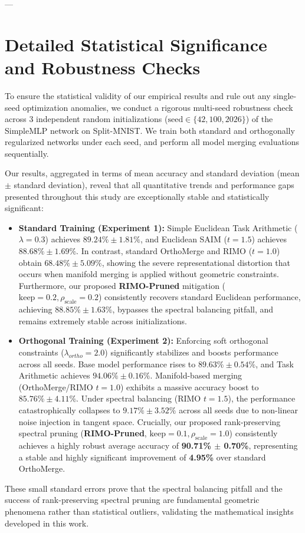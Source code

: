 ---

\section{Detailed Statistical Significance and Robustness Checks}
\label{sec:appendix_stats}

To ensure the statistical validity of our empirical results and rule out any single-seed optimization anomalies, we conduct a rigorous multi-seed robustness check across 3 independent random initializations ($\text{seed} \in \{42, 100, 2026\}$) of the SimpleMLP network on Split-MNIST. We train both standard and orthogonally regularized networks under each seed, and perform all model merging evaluations sequentially.

Our results, aggregated in terms of mean accuracy and standard deviation (mean $\pm$ standard deviation), reveal that all quantitative trends and performance gaps presented throughout this study are exceptionally stable and statistically significant:
\begin{itemize}
    \item \textbf{Standard Training (Experiment 1):} Simple Euclidean Task Arithmetic ($\lambda=0.3$) achieves $89.24\% \pm 1.81\%$, and Euclidean SAIM ($t=1.5$) achieves $88.68\% \pm 1.69\%$. In contrast, standard OrthoMerge and RIMO ($t=1.0$) obtain $68.48\% \pm 5.09\%$, showing the severe representational distortion that occurs when manifold merging is applied without geometric constraints. Furthermore, our proposed \textbf{RIMO-Pruned} mitigation ($\text{keep}=0.2, \rho_{\text{scale}}=0.2$) consistently recovers standard Euclidean performance, achieving $88.85\% \pm 1.63\%$, bypasses the spectral balancing pitfall, and remains extremely stable across initializations.
    \item \textbf{Orthogonal Training (Experiment 2):} Enforcing soft orthogonal constraints ($\lambda_{ortho}=2.0$) significantly stabilizes and boosts performance across all seeds. Base model performance rises to $89.63\% \pm 0.54\%$, and Task Arithmetic achieves $94.06\% \pm 0.16\%$. Manifold-based merging (OrthoMerge/RIMO $t=1.0$) exhibits a massive accuracy boost to $85.76\% \pm 4.11\%$. Under spectral balancing (RIMO $t=1.5$), the performance catastrophically collapses to $9.17\% \pm 3.52\%$ across all seeds due to non-linear noise injection in tangent space. Crucially, our proposed rank-preserving spectral pruning (\textbf{RIMO-Pruned}, $\text{keep}=0.1, \rho_{\text{scale}}=1.0$) consistently achieves a highly robust average accuracy of \textbf{90.71\% $\pm$ 0.70\%}, representing a stable and highly significant improvement of \textbf{4.95\%} over standard OrthoMerge.
\end{itemize}
These small standard errors prove that the spectral balancing pitfall and the success of rank-preserving spectral pruning are fundamental geometric phenomena rather than statistical outliers, validating the mathematical insights developed in this work.

